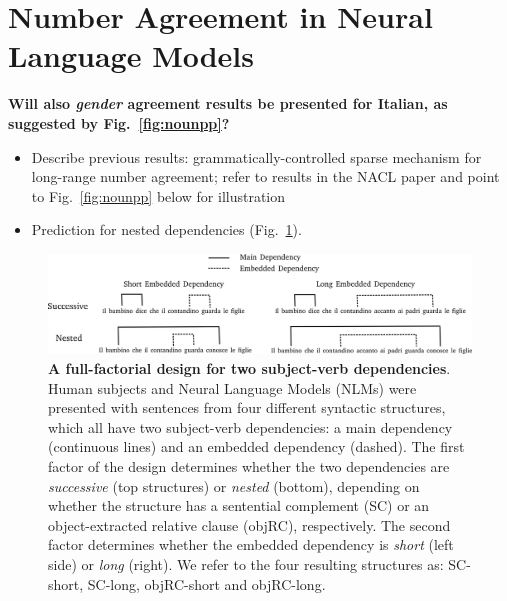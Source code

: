 \section{Number Agreement in Neural Language Models}

\textbf{Will also \emph{gender} agreement results be presented for Italian, as suggested by Fig.~\ref{fig:nounpp}?}

\begin{itemize}
\item Describe previous results: grammatically-controlled sparse
  mechanism for long-range number agreement; refer to results in the
  NACL paper and point to Fig.~\ref{fig:nounpp} below for illustration
    \item Prediction for nested dependencies (Fig.~\ref{fig:design}).
\end{itemize}

\begin{figure}
    \centering
    \includegraphics[width=\textwidth]{figures/design.png}
    \caption{\textbf{A full-factorial design for two subject-verb dependencies}. Human subjects and Neural Language Models (NLMs) were presented with sentences from four different syntactic structures, which all have two subject-verb dependencies: a main dependency (continuous lines) and an embedded dependency (dashed). The first factor of the design determines whether the two dependencies are \textit{successive} (top structures) or \textit{nested} (bottom), depending on whether the structure has a sentential complement (SC) or an object-extracted relative clause (objRC), respectively. The second factor determines whether the embedded dependency is \textit{short} (left side) or \textit{long} (right). We refer to the four resulting structures as: SC-short, SC-long, objRC-short and objRC-long.}
    \label{fig:design}
\end{figure}